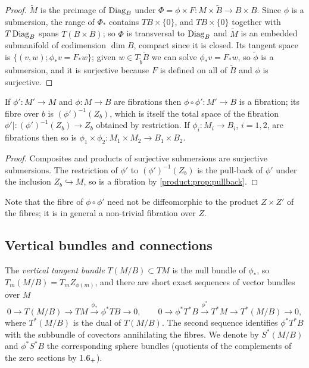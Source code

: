 \begin{proof}
$\tilde M$ is the preimage of $\operatorname{Diag}_B$ under $\Phi=\phi\times
F:M\times\tilde B\longrightarrow B\times B$. Since $\phi$ is a submersion, the
range of $\Phi_*$ contains $TB\times\{0\}$, and $TB\times\{0\}$ together with
$T\operatorname{Diag}_B$ spans $T(B\times B)$; so $\Phi$ is transversal to $\operatorname{Diag}_B$ and
$\tilde M$ is an embedded submanifold of codimension $\dim B$, compact since it
is closed. Its tangent space is $\{(v,w);\phi_*v=F_*w\}$; given $w\in
T_{\tilde b}\tilde B$ we can solve $\phi_*v=F_*w$, so $\tilde\phi$ is a
submersion, and it is surjective because $F$ is defined on all of $\tilde B$ and
$\phi$ is surjective.
\end{proof}

\begin{proposition}\label{product:prop:composite}
If $\phi':M'\longrightarrow M$ and $\phi:M\longrightarrow B$ are fibrations then
$\phi\circ\phi':M'\longrightarrow B$ is a fibration; its fibre over $b$ is
$(\phi')^{-1}(Z_b)$, which is itself the total space of the fibration
$\phi'|:(\phi')^{-1}(Z_b)\longrightarrow Z_b$ obtained by restriction.
If $\phi_i:M_i\longrightarrow B_i$, $i=1,2$, are fibrations then so is
$\phi_1\times\phi_2:M_1\times M_2\longrightarrow B_1\times B_2$.
\end{proposition}

\begin{proof}
Composites and products of surjective submersions are surjective submersions.
The restriction of $\phi'$ to $(\phi')^{-1}(Z_b)$ is the pull-back of $\phi'$
under the inclusion $Z_b\hookrightarrow M$, so is a fibration by
\cref{product:prop:pullback}.
\end{proof}

Note that the fibre of $\phi\circ\phi'$ need not be diffeomorphic to the product
$Z\times Z'$ of the fibres; it is in general a non-trivial fibration over $Z$.

\subsection{Vertical bundles and connections}
The \emph{vertical tangent bundle} $T(M/B)\subset TM$ is the null bundle of
$\phi_*$, so $T_m(M/B)=T_mZ_{\phi(m)}$, and there are short exact sequences of
vector bundles over $M$
\begin{equation}\label{product:eq:vertical}
0\longrightarrow T(M/B)\longrightarrow TM\overset{\phi_*}\longrightarrow\phi^*TB
\longrightarrow0,\qquad
0\longrightarrow\phi^*T^*B\overset{\phi^*}\longrightarrow T^*M\longrightarrow
T^*(M/B)\longrightarrow0,
\end{equation}
where $T^*(M/B)$ is the dual of $T(M/B)$. The second sequence identifies
$\phi^*T^*B$ with the subbundle of covectors annihilating the fibres. We denote
by $S^*(M/B)$ and $\phi^*S^*B$ the corresponding sphere bundles (quotients of the
complements of the zero sections by $1.6_+$).

